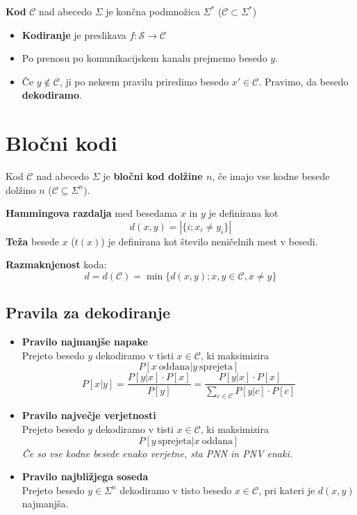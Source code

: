 \begin{multicols}{5}
\textbf{Kod} $\mathcal{C}$ nad abecedo $\Sigma$ je končna podmnožica $\Sigma^*$ ($\mathcal{C}\subset \Sigma^*$)

\begin{itemize}
	\item \textbf{Kodiranje} je preslikava $f: \mathcal{S}\rightarrow\mathcal{C}$
	\item Po prenosu po komunikacijskem kanalu prejmemo besedo $y$.
	\item Če $y \notin \mathcal{C}$, ji po nekeem pravilu priredimo besedo
		$x\prime \in \mathcal{C}$. Pravimo, da besedo \textbf{dekodiramo}.
\end{itemize}


\section{Bločni kodi}
Kod $\mathcal{C}$ nad abecedo $\Sigma$ je \textbf{bločni kod dolžine $n$}, 
če imajo vse kodne besede dolžino $n$ ($\mathcal{C} \subseteq \Sigma^n$).

\textbf{Hammingova razdalja} med besedama $x$ in $y$ je definirana kot
\[ d(x,y) = |\{i;x_i\neq y_i\}|\]
\textbf{Teža} besede $x$ ($t(x)$) je definirana kot število neničelnih mest v besedi.

\textbf{Razmaknjenost} koda:
\[d = d(\mathcal{C}) = \min\{d(x,y); x,y\in \mathcal{C}, x \ne y\}\]

\subsection*{Pravila za dekodiranje}

\begin{itemize}
	\item \textbf{Pravilo najmanjše napake} \\
		Prejeto besedo $y$ dekodiramo v tisti $x \in \mathcal{C}$, ki maksimizira
		\[P[x\ \text{oddana}|y\ \text{sprejeta}]\]
		\[P[x|y] = \frac{P[y|x]\cdot P[x]}{P[y]} = \frac{P[y|x]\cdot P[x]}{\sum_{c\in\mathcal{C}}P[y|c]\cdot P[c]}\]
	\item \textbf{Pravilo največje verjetnosti} \\
		Prejeto besedo $y$ dekodiramo v tisti $x \in \mathcal{C}$, ki maksimizira
		\[P[y\ \text{sprejeta}|x\ \text{oddana}]\]
		\textit{Če so vse kodne besede enako verjetne, sta PNN in PNV enaki.}
	\item \textbf{Pravilo najbližjega soseda} \\
		Prejeto besedo $y\in \Sigma^n$ dekodiramo v tisto besedo $x\in \mathcal{C}$, pri kateri je $d(x,y)$ najmanjša.


\end{itemize}
\end{multicols}
